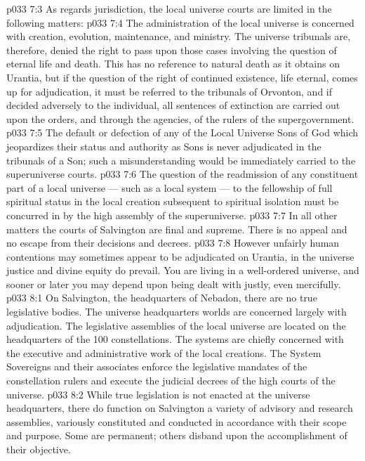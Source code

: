 \vs p033 7:3 As regards jurisdiction, the local universe courts are limited in the following matters:
\vs p033 7:4 \bibnobreakspace The administration of the local universe is concerned with creation, evolution, maintenance, and ministry. The universe tribunals are, therefore, denied the right to pass upon those cases involving the question of eternal life and death. This has no reference to natural death as it obtains on Urantia, but if the question of the right of continued existence, life eternal, comes up for adjudication, it must be referred to the tribunals of Orvonton, and if decided adversely to the individual, all sentences of extinction are carried out upon the orders, and through the agencies, of the rulers of the supergovernment.
\vs p033 7:5 \bibnobreakspace The default or defection of any of the Local Universe Sons of God which jeopardizes their status and authority as Sons is never adjudicated in the tribunals of a Son; such a misunderstanding would be immediately carried to the superuniverse courts.
\vs p033 7:6 \bibnobreakspace The question of the readmission of any constituent part of a local universe --- such as a local system --- to the fellowship of full spiritual status in the local creation subsequent to spiritual isolation must be concurred in by the high assembly of the superuniverse.
\vs p033 7:7 \pc In all other matters the courts of Salvington are final and supreme. There is no appeal and no escape from their decisions and decrees.
\vs p033 7:8 However unfairly human contentions may sometimes appear to be adjudicated on Urantia, in the universe justice and divine equity do prevail. You are living in a well\hyp{}ordered universe, and sooner or later you may depend upon being dealt with justly, even mercifully.
\vs p033 8:1 On Salvington, the headquarters of Nebadon, there are no true legislative bodies. The universe headquarters worlds are concerned largely with adjudication. The legislative assemblies of the local universe are located on the headquarters of the 100 constellations. The systems are chiefly concerned with the executive and administrative work of the local creations. The System Sovereigns and their associates enforce the legislative mandates of the constellation rulers and execute the judicial decrees of the high courts of the universe.
\vs p033 8:2 While true legislation is not enacted at the universe headquarters, there do function on Salvington a variety of advisory and research assemblies, variously constituted and conducted in accordance with their scope and purpose. Some are permanent; others disband upon the accomplishment of their objective.
